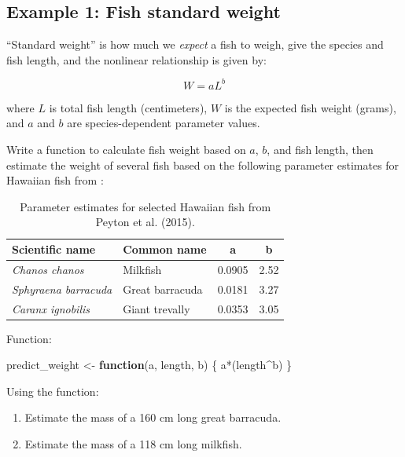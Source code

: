 \documentclass[
]{book}
\newenvironment{Shaded}{\begin{snugshade}}{\end{snugshade}}
\newcommand{\ControlFlowTok}[1]{\textcolor[rgb]{0.13,0.29,0.53}{\textbf{#1}}}
\newcommand{\NormalTok}[1]{#1}
\newcommand{\OtherTok}[1]{\textcolor[rgb]{0.56,0.35,0.01}{#1}}
\newcommand{\SpecialCharTok}[1]{\textcolor[rgb]{0.00,0.00,0.00}{#1}}
\providecommand{\tightlist}{%
  \setlength{\itemsep}{0pt}\setlength{\parskip}{0pt}}
\begin{document}
\hypertarget{example-1-fish-standard-weight}{%
\subsection{Example 1: Fish standard weight}\label{example-1-fish-standard-weight}}

``Standard weight'' is how much we \emph{expect} a fish to weigh, give the species and fish length, and the nonlinear relationship is given by:

\[W=aL^b\]

where \(L\) is total fish length (centimeters), \(W\) is the expected fish weight (grams), and \(a\) and \(b\) are species-dependent parameter values.

Write a function to calculate fish weight based on \(a\), \(b\), and fish length, then estimate the weight of several fish based on the following parameter estimates for Hawaiian fish from \citet{peyton_lengthweight_2016}:

\begin{table}

\caption{\label{tab:unnamed-chunk-11}Parameter estimates for selected Hawaiian fish from Peyton et al. (2015).}
\centering
\begin{tabular}[t]{>{}l|l|c|c}
\hline
Scientific name & Common name & a & b\\
\hline
\em{Chanos chanos} & Milkfish & 0.0905 & 2.52\\
\hline
\em{Sphyraena barracuda} & Great barracuda & 0.0181 & 3.27\\
\hline
\em{Caranx ignobilis} & Giant trevally & 0.0353 & 3.05\\
\hline
\end{tabular}
\end{table}

Function:

\begin{Shaded}
\begin{Highlighting}[]
\NormalTok{predict\_weight }\OtherTok{\textless{}{-}} \ControlFlowTok{function}\NormalTok{(a, length, b) \{}
\NormalTok{  a}\SpecialCharTok{*}\NormalTok{(length}\SpecialCharTok{\^{}}\NormalTok{b)}
\NormalTok{\}}
\end{Highlighting}
\end{Shaded}

Using the function:

\begin{enumerate}
\def\labelenumi{\arabic{enumi}.}
\tightlist
\item
  Estimate the mass of a 160 cm long great barracuda.
\item
  Estimate the mass of a 118 cm long milkfish.
\end{enumerate}
\end{document}
